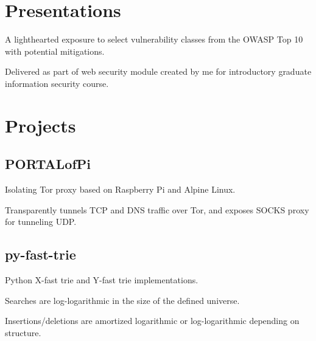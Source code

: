 \documentclass[]{deedy-resume-openfont}
\begin{document}
\begin{minipage}[t]{0.64\textwidth}
\section{Presentations} 
\begin{tightemize}
\item A lighthearted exposure to select vulnerability classes from the OWASP Top 10 with potential mitigations.
\item Delivered as part of web security module created by me for introductory graduate information security course.
\end{tightemize}
\sectionsep


\section{Projects}
\subsection{PORTALofPi}
\vspace{\topsep} %
\begin{tightemize}
\item Isolating Tor proxy based on Raspberry Pi and Alpine Linux.
\item Transparently tunnels TCP and DNS traffic over Tor, and exposes SOCKS proxy for tunneling UDP.
\end{tightemize}
\sectionsep

\subsection{py-fast-trie}
\vspace{\topsep} %
\begin{tightemize}
\item Python X-fast trie and Y-fast trie implementations.
\item Searches are log-logarithmic in the size of the defined universe.
\item Insertions/deletions are amortized logarithmic or log-logarithmic depending on structure.
\end{tightemize}
\sectionsep


\end{minipage}
\end{document}
